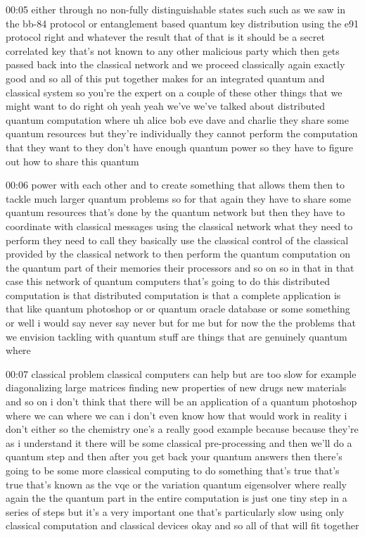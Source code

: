 00:05
either through no non-fully distinguishable states such
such as we saw in the bb-84 protocol or entanglement based quantum key
distribution using the e91 protocol right and whatever the result that of
that is it should be a secret correlated key
that's not known to any other malicious party which then gets passed back
into the classical network and we proceed classically again exactly
good and so all of this put together makes for an integrated quantum and
classical system so you're the expert on a couple of
these other things that we might want to do
right oh yeah yeah we've we've talked about
distributed quantum computation where uh alice bob eve dave and charlie they
share some quantum resources but they're individually they cannot
perform the computation that they want to they don't
have enough quantum power so they have to figure out how to share this quantum

00:06
power with each other and to create something that allows them then to
tackle much larger quantum problems so for that again they have to share
some quantum resources that's done by the quantum network but
then they have to coordinate with classical messages using the classical network
what they need to perform they need to call they basically use the classical
control of the classical provided by the classical network to
then perform the quantum computation on the quantum part of their memories
their processors and so on so in that in that case this network of
quantum computers that's going to do this distributed computation
is that distributed computation is that a complete application is that like
quantum photoshop or or quantum oracle database or some something or
well i would say never say never but for me but for now the the problems that we
envision tackling with quantum stuff are things that are genuinely quantum where

00:07
classical problem classical computers can help but are too slow
for example diagonalizing large matrices finding new properties of new drugs new
materials and so on i don't think that there will
be an application of a quantum photoshop where we can
where we can i don't even know how that would work in reality i don't either so
the chemistry one's a really good example because because they're
as i understand it there will be some classical pre-processing and then
we'll do a quantum step and then after you get back your quantum answers
then there's going to be some more classical computing to do something
that's true that's true that's known as the vqe or the variation
quantum eigensolver where really again the the quantum part
in the entire computation is just one tiny step in a series of steps
but it's a very important one that's particularly slow using only classical
computation and classical devices okay and so all of that will fit together

